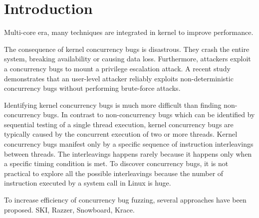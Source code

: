 \section{Introduction}
\label{s:intro}


Multi-core era, many techniques are integrated in kernel to improve performance. 

The consequence of kernel concurrency bugs is disastrous. They crash
the entire system, breaking availability or causing data loss. 
Furthermore, attackers 
exploit a concurrency bugs to mount a privilege escalation attack.
A recent study~\cite{exprace} demonstrates that an user-level attacker 
reliably exploits non-deterministic concurrency bugs without performing
brute-force attacks.

Identifying kernel concurrency bugs is much more difficult than 
finding non-concurrency bugs. 
In contrast to non-concurrency bugs which can be identified by 
sequential testing of a single thread execution,
kernel concurrency bugs are typically caused by the concurrent execution 
of two or more threads.
Kernel concurrency bugs manifest only by a specific sequence of
instruction interleavings between threads. The interleavings happens 
rarely because it happens only when a specific timing condition is met.
To discover concurrency bugs, it is not practical to explore all
the possible interleavings because the number of instruction
executed by a system call in Linux is huge.

To increase efficiency of concurrency bug fuzzing, several approaches
have been proposed. SKI, Razzer, Snowboard, Krace.



